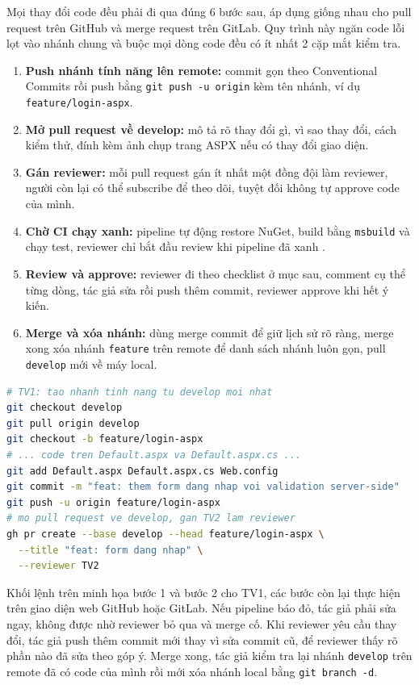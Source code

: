 Mọi thay đổi code đều phải đi qua đúng 6 bước sau, áp dụng giống nhau cho pull request trên GitHub và merge request trên GitLab.
Quy trình này ngăn code lỗi lọt vào nhánh chung và buộc mọi dòng code đều có ít nhất 2 cặp mắt kiểm tra.

\begin{enumerate}
\item \textbf{Push nhánh tính năng lên remote:} commit gọn theo Conventional Commits rồi push bằng \verb|git push -u origin| kèm tên nhánh, ví dụ \verb|feature/login-aspx|.
\item \textbf{Mở pull request về develop:} mô tả rõ thay đổi gì, vì sao thay đổi, cách kiểm thử, đính kèm ảnh chụp trang ASPX nếu có thay đổi giao diện.
\item \textbf{Gán reviewer:} mỗi pull request gán ít nhất một đồng đội làm reviewer, người còn lại có thể subscribe để theo dõi, tuyệt đối không tự approve code của mình.
\item \textbf{Chờ CI chạy xanh:} pipeline tự động restore NuGet, build bằng \verb|msbuild| và chạy test, reviewer chỉ bắt đầu review khi pipeline đã xanh \cite{ghactions,gitlabci,msmsbuild}.
\item \textbf{Review và approve:} reviewer đi theo checklist ở mục sau, comment cụ thể từng dòng, tác giả sửa rồi push thêm commit, reviewer approve khi hết ý kiến.
\item \textbf{Merge và xóa nhánh:} dùng merge commit để giữ lịch sử rõ ràng, merge xong xóa nhánh \texttt{feature} trên remote để danh sách nhánh luôn gọn, pull \texttt{develop} mới về máy local.
\end{enumerate}

\begin{lstlisting}[language=bash, caption={Day nhanh tinh nang va mo pull request ve develop}, label={lst:c7-pr}]
# TV1: tao nhanh tinh nang tu develop moi nhat
git checkout develop
git pull origin develop
git checkout -b feature/login-aspx
# ... code tren Default.aspx va Default.aspx.cs ...
git add Default.aspx Default.aspx.cs Web.config
git commit -m "feat: them form dang nhap voi validation server-side"
git push -u origin feature/login-aspx
# mo pull request ve develop, gan TV2 lam reviewer
gh pr create --base develop --head feature/login-aspx \
  --title "feat: form dang nhap" \
  --reviewer TV2
\end{lstlisting}

Khối lệnh trên minh họa bước 1 và bước 2 cho TV1, các bước còn lại thực hiện trên giao diện web GitHub hoặc GitLab.
Nếu pipeline báo đỏ, tác giả phải sửa ngay, không được nhờ reviewer bỏ qua và merge cố.
Khi reviewer yêu cầu thay đổi, tác giả push thêm commit mới thay vì sửa commit cũ, để reviewer thấy rõ phần nào đã sửa theo góp ý.
Merge xong, tác giả kiểm tra lại nhánh \texttt{develop} trên remote đã có code của mình rồi mới xóa nhánh local bằng \verb|git branch -d|.

